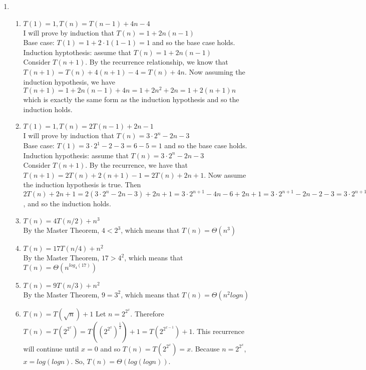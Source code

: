 \documentclass{article}
\begin{document}
\begin{enumerate}
	\item 
	\begin{enumerate}
		\item $T(1) = 1, T(n) = T(n-1) + 4n - 4$ \\
		I will prove by induction that $T(n) = 1 + 2n(n-1)$\\
		Base case: $T(1) = 1 + 2\cdot 1(1 - 1) = 1$ and so the base case holds.  
		Induction hyptothesis: assume that $T(n) = 1 + 2n(n-1)$ \\
		Consider $T(n+1)$.  By the recurrence relationship, we know that $T(n+1) = T(n) + 4(n+1)-4 = T(n) + 4n$.  Now assuming the induction hypothesis, we have $T(n+1) = 1 + 2n(n-1) + 4n = 1 + 2n^2 + 2n = 1 + 2(n+1)n$ which is exactly the same form as the induction hypothesis and so the induction holds.  
		\item $T(1) = 1, T(n) = 2T(n-1) + 2n - 1$ \\
		I will prove by induction that $T(n) = 3 \cdot 2^n - 2n - 3$ \\
		Base case: $T(1) = 3 \cdot 2^1 - 2 - 3 = 6 - 5 = 1$ and so the base case holds.  \\
		Induction hypothesis: assume that $T(n) = 3 \cdot 2^n - 2n -3$ \\
		Consider $T(n+1)$.  By the recurrence, we have that $T(n+1) = 2T(n) + 2(n+1) - 1 = 2T(n) + 2n + 1$.  Now assume the induction hypothesis is true.  Then $2T(n) + 2n + 1 = 2(3\cdot 2^n - 2n - 3) + 2n + 1 = 3 \cdot 2 ^{n+1} - 4n - 6 + 2n + 1 = 3 \cdot 2 ^ {n+1} -2n - 2 - 3 = 3 \cdot 2^{n+1} - 2(n+1) - 3$, and so the induction holds.   
		\item $T(n) = 4T(n/2) + n^3$ \\
		By the Master Theorem, $4 < 2^3$, which means that $T(n) = \Theta(n^3)$\\
		\item $T(n) = 17T(n/4) + n^2$ \\
		By the Master Theorem, $17 > 4^2$, which means that $T(n) = \Theta(n^{log_4(17)})$ \\
		\item $T(n) = 9T(n/3) + n^2$ \\
		By the Master Theorem, $ 9 = 3^2$, which means that $T(n) = \Theta(n^2logn)$
		\item $T(n) = T(\sqrt{n}) + 1$ 
		Let $n = 2^{2^x}$.  Therefore $T(n) =  T(2^{2^x}) = T((2^{2^x})^{\frac{1}{2}}) + 1 = T(2^{2^{x - 1}}) + 1$.  This recurrence will continue until $x = 0$ and so $T(n) = T(2^{2^x}) = x$.  Because $n = 2^{2^x}$, $x = log(logn)$. So, $T(n) = \Theta(log(logn))$.  
	\end{enumerate}
	

\end{enumerate}
\end{document}
